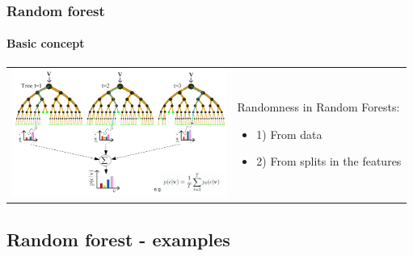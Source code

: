 \begin{frame}
	\frametitle{Random forest}
		\framesubtitle{Basic concept}

		\begin{center}
		\begin{tabular}{m{7cm} m{3cm}}
		\includegraphics[width=7cm]{./figures/basic_concept}
		&
		Randomness in Random Forests:
		\begin{itemize}
		  \item 1) From data
		  \item 2) From splits in the features
		\end{itemize}
		\\
		\end{tabular}
		\end{center}
		
\end{frame}

\subsection{Random forest - examples} %

